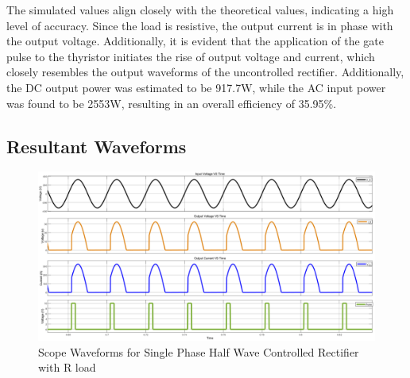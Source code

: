 The simulated values align closely with the theoretical values, indicating a high level of accuracy. Since the load is resistive, the output current is in phase with the output voltage. Additionally, it is evident that the application of the gate pulse to the thyristor initiates the rise of output voltage and current, which closely resembles the output waveforms of the uncontrolled rectifier.
Additionally, the DC output power was estimated to be 917.7W, while the AC input power was found to be 2553W, resulting in an overall efficiency of 35.95\%.

\pagebreak


\subsection{Resultant Waveforms}

\begin{figure}[h]
    \centering
    \includegraphics[width=1\textwidth]{images/experiment-1/circuit-scope-experiment-05.png}
    \caption{Scope Waveforms for Single Phase Half Wave Controlled Rectifier with R load}
    \label{Fig_waveform_single-phase-half-wave-controlled-rectifier-with-R-load}
\end{figure}

\pagebreak